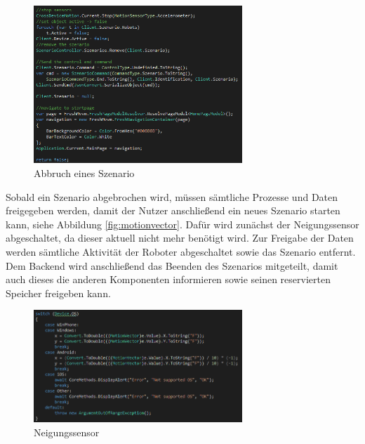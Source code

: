 \begin{figure}[h]
	\begin{center}
		\includegraphics[width=0.7\textwidth]{images/implementation/cancelszenario.png}
	\end{center}	
	\caption{Abbruch eines Szenario}
	\label{fig:cancelszenario}
\end{figure}

\noindent
Sobald ein Szenario abgebrochen wird, müssen sämtliche Prozesse und Daten freigegeben werden, damit der Nutzer anschließend ein neues Szenario starten kann, siehe Abbildung \eqref{fig:motionvector}. Dafür wird zunächst der Neigungssensor abgeschaltet, da dieser aktuell nicht mehr benötigt wird. Zur Freigabe der Daten werden sämtliche Aktivität der Roboter abgeschaltet sowie das Szenario entfernt. Dem Backend wird anschließend das Beenden des Szenarios mitgeteilt, damit auch dieses die anderen Komponenten informieren sowie seinen reservierten Speicher freigeben kann.

\begin{figure}[h]
	\begin{center}
		\includegraphics[width=0.7\textwidth]{images/implementation/motionvector.png}
	\end{center}	
	\caption{Neigungssensor}
	\label{fig:motionvector}
\end{figure}

